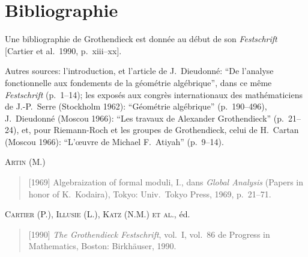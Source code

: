 \documentclass[11pt,a4paper]{article}
\theoremstyle{plain}
\theoremstyle{definition}
\begin{document}
\section*{Bibliographie}

Une bibliographie de Grothendieck est donn\'ee au d\'ebut de son \emph{Festschrift} [Cartier et al.\ 1990, p.~xiii--xx].

Autres sources: l'introduction, et l'article de J.~Dieudonn\'e: ``De l'analyse fonctionnelle aux fondements de la g\'eom\'etrie alg\'ebrique'', dans ce m\^eme \emph{Festschrift} (p.~1--14); les expos\'es aux congr\`es internationaux des math\'ematiciens de J.-P.~Serre (Stockholm 1962): ``G\'eom\'etrie alg\'ebrique'' (p.~190--496), J.~Dieudonn\'e (Moscou 1966): ``Les travaux de Alexander Grothendieck'' (p.~21--24), et, pour Riemann-Roch et les groupes de Grothendieck, celui de H.~Cartan (Moscou 1966): ``L'\oe uvre de Michael F.~Atiyah'' (p.~9--14).

\medskip

\noindent\textsc{Artin (M.)}
\begin{quote}
[1969] Algebraization of formal moduli, I., dans \emph{Global Analysis} (Papers in honor of K.~Kodaira), Tokyo: Univ.\ Tokyo Press, 1969, p.~21--71.
\end{quote}

\medskip
\noindent\textsc{Cartier (P.), Illusie (L.), Katz (N.M.) et al.}, \'ed.
\begin{quote}
[1990] \emph{The Grothendieck Festschrift}, vol.~I, vol.~86 de Progress in Mathematics, Boston: Birkh\"auser, 1990.
\end{quote}
\end{document}
